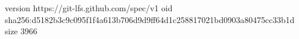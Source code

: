version https://git-lfs.github.com/spec/v1
oid sha256:d5182b3c9c095f1f4a613b706d9d9ff64d1c258817021bd0903a80475cc33b1d
size 3966
